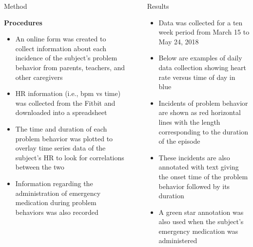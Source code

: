 \documentclass[final]{beamer}
\newlength{\sepwid}
\newlength{\onecolwid}
\newlength{\twocolwid}
\begin{document}
\begin{frame}[t]
\begin{columns}[t]
\begin{column}{\onecolwid}
\begin{alertblock}{Method}
	\begin{center}
		\textbf{Procedures}
	\end{center}
	\begin{itemize}
		\item An online form was created to collect information about each incidence of the subject's problem behavior from parents, teachers, and other caregivers
		\item HR information (i.e., bpm vs time) was collected from the Fitbit and downloaded into a spreadsheet
		\item The time and duration of each problem behavior was plotted to overlay time series data of the subject's HR to look for correlations between the two
		\item Information regarding the administration of emergency medication during problem behaviors was also recorded
	\end{itemize}

\end{alertblock}


\end{column} %

\begin{column}{\sepwid}\end{column} %

\begin{column}{\twocolwid} %
	

\begin{alertblock}{Results}
	
	\begin{itemize}
		\item Data was collected for a ten week period from March 15 to May 24, 2018
		\item Below are examples of daily data collection showing heart rate versus time of day in blue
		\item Incidents of problem behavior are shown as red horizontal lines with the length corresponding to the duration of the episode
		\item These incidents are also annotated with text giving the onset time of the problem behavior followed by its duration
		\item A green star annotation was also used when the subject's emergency medication was administered
	\end{itemize}
	

\end{alertblock}
\end{column}
\end{columns}
\end{frame}
\end{document}
